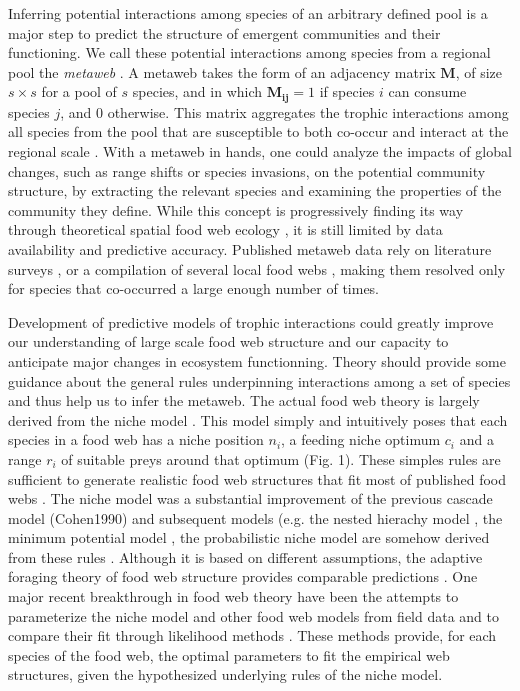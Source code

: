 \documentclass[12pt]{article}
\begin{document}
Inferring potential interactions among species of an arbitrary defined pool is a major step to predict the structure of emergent communities and their functioning. We call these potential interactions among species from a regional pool the \emph{metaweb} \parencite{Dunne2006}. A metaweb takes the form of an adjacency matrix $\mathbf{M}$, of size $s\times s$ for a pool of $s$ species, and in which $\mathbf{M_{ij}} = 1$ if species $i$ can consume species $j$, and $0$ otherwise. This matrix aggregates the trophic interactions among all species from the pool that are susceptible to both co-occur and interact at the regional scale \parencite{Dunne2006}. With a metaweb in hands, one could analyze the impacts of global changes, such as range shifts or species invasions, on the potential community structure, by extracting the relevant species and examining the properties of the community they define. While this concept is progressively finding its way through theoretical spatial food web ecology \parencite{Lafferty2010, Pillai2009, Gravel2011a, Gravel2011b}, it is still limited by data availability and predictive accuracy. Published metaweb data rely on literature surveys \parencite{Havens1992, Piechnik2008, Baiser2012}, or a compilation of several local food webs \parencite{Stanko2002, Poisot2012a}, making them resolved only for species that co-occurred a large enough number of times. 

Development of predictive models of trophic interactions could greatly improve our understanding of large scale food web structure and our capacity to anticipate major changes in ecosystem functionning. Theory should provide some guidance about the general rules underpinning interactions among a set of species and thus help us to infer the metaweb. The actual food web theory is largely derived from the niche model \parencite{Williams2000}. This model simply and intuitively poses that each species in a food web has a niche position $n_i$, a feeding niche optimum $c_i$ and a range $r_i$ of suitable preys around that optimum (Fig. 1). These simples rules are sufficient to generate realistic food web structures that fit most of published food webs \parencite{Dunne2006}. The niche model was a substantial improvement of the previous cascade model (Cohen1990) and subsequent models (e.g. the nested hierachy model \parencite{Cattin2004}, the minimum potential model \parencite{Allesina2008}, the probabilistic niche model \parencite{Williams2010} are somehow derived from these rules \parencite{Stouffer2005}. Although it is based on different assumptions, the adaptive foraging theory of food web structure \parencite{Petchey2008b} provides comparable predictions \parencite{Williams2010}. One major recent breakthrough in food web theory have been the attempts to parameterize the niche model and other food web models from field data and to compare their fit through likelihood methods \parencite{Allesina2008, Williams2010, Williams2011}. These methods provide, for each species of the food web, the optimal parameters to fit the empirical web structures, given the hypothesized underlying rules of the niche model. 
\end{document}
